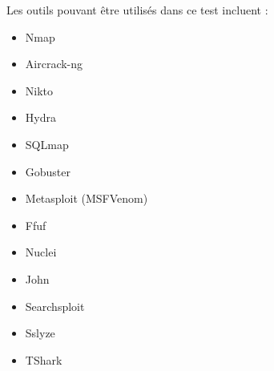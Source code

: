 \documentclass{article}
\begin{document}
Les outils pouvant être utilisés dans ce test incluent :
\begin{itemize}
    \item Nmap
    \item Aircrack-ng 
    \item Nikto
    \item Hydra
    \item SQLmap
    \item Gobuster
    \item Metasploit (MSFVenom)
    \item Ffuf
    \item Nuclei
    \item John
    \item Searchsploit
    \item Sslyze
    \item TShark
\end{itemize}

\end{document}
